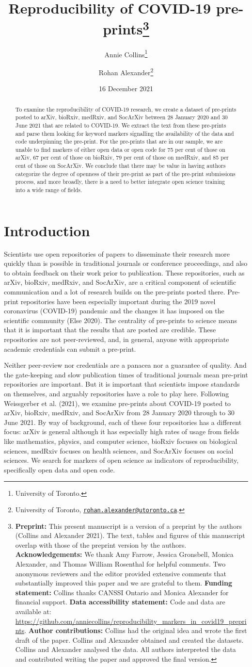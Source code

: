 \documentclass[
]{article}
\title{Reproducibility of COVID-19 pre-prints\thanks{\textbf{Preprint:} This present manuscript is a version of a preprint by the authors (Collins and Alexander 2021). The text, tables and figures of this manuscript overlap with those of the preprint version by the authors. \textbf{Acknowledgements:} We thank Amy Farrow, Jessica Gronsbell, Monica Alexander, and Thomas William Rosenthal for helpful comments. Two anonymous reviewers and the editor provided extensive comments that substantially improved this paper and we are grateful to them. \textbf{Funding statement:} Collins thanks CANSSI Ontario and Monica Alexander for financial support. \textbf{Data accessibility statement:} Code and data are available at: \url{https://github.com/anniecollins/reproducibility_markers_in_covid19_preprints}. \textbf{Author contributions:} Collins had the original idea and wrote the first draft of the paper. Collins and Alexander obtained and created the datasets. Collins and Alexander analysed the data. All authors interpreted the data and contributed writing the paper and approved the final version.}}
\author{Annie Collins\footnote{University of Toronto.} \and Rohan Alexander\footnote{University of Toronto, \href{mailto:rohan.alexander@utoronto.ca}{\nolinkurl{rohan.alexander@utoronto.ca}}.}}
\date{16 December 2021}
\begin{document}
\maketitle
\begin{abstract}
To examine the reproducibility of COVID-19 research, we create a dataset of pre-prints posted to arXiv, bioRxiv, medRxiv, and SocArXiv between 28 January 2020 and 30 June 2021 that are related to COVID-19. We extract the text from these pre-prints and parse them looking for keyword markers signalling the availability of the data and code underpinning the pre-print. For the pre-prints that are in our sample, we are unable to find markers of either open data or open code for 75 per cent of those on arXiv, 67 per cent of those on bioRxiv, 79 per cent of those on medRxiv, and 85 per cent of those on SocArXiv. We conclude that there may be value in having authors categorize the degree of openness of their pre-print as part of the pre-print submissions process, and more broadly, there is a need to better integrate open science training into a wide range of fields.
\end{abstract}

\hypertarget{introduction}{%
\section{Introduction}\label{introduction}}

Scientists use open repositories of papers to disseminate their research more quickly than is possible in traditional journals or conference proceedings, and also to obtain feedback on their work prior to publication. These repositories, such as arXiv, bioRxiv, medRxiv, and SocArXiv, are a critical component of scientific communication and a lot of research builds on the pre-prints posted there. Pre-print repositories have been especially important during the 2019 novel coronavirus (COVID-19) pandemic and the changes it has imposed on the scientific community (Else 2020). The centrality of pre-prints to science means that it is important that the results that are posted are credible. These repositories are not peer-reviewed, and, in general, anyone with appropriate academic credentials can submit a pre-print.

Neither peer-review nor credentials are a panacea nor a guarantee of quality. And the gate-keeping and slow publication times of traditional journals mean pre-print repositories are important. But it is important that scientists impose standards on themselves, and arguably repositories have a role to play here. Following Weissgerber et al. (2021), we examine pre-prints about COVID-19 posted to arXiv, bioRxiv, medRxiv, and SocArXiv from 28 January 2020 through to 30 June 2021. By way of background, each of these four repositories has a different focus: arXiv is general although it has especially high rates of usage from fields like mathematics, physics, and computer science, bioRxiv focuses on biological sciences, medRxiv focuses on health sciences, and SocArXiv focuses on social sciences. We search for markers of open science as indicators of reproducibility, specifically open data and open code.
\end{document}
